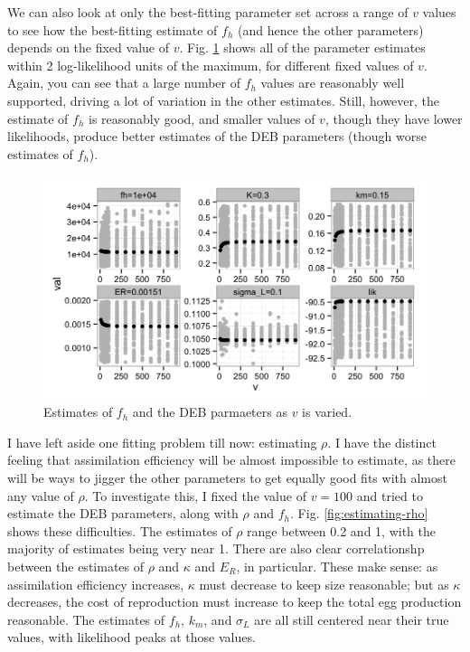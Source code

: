 \documentclass[12pt,reqno,final,pdftex]{amsart}\usepackage[]{graphicx}\usepackage[]{color}
\newenvironment{knitrout}{}{} %
\theoremstyle{plain}
\numberwithin{equation}{part}
\begin{document}
We can also look at only the best-fitting parameter set across a range of $v$ values to see how the best-fitting estimate of $f_h$ (and hence the other parameters) depends on the fixed value of $v$.
Fig. \ref{fig:dyn-food-fh-est-profile-v} shows all of the parameter estimates within 2 log-likelihood units of the maximum, for different fixed values of $v$.
Again, you can see that a large number of $f_h$ values are reasonably well supported, driving a lot of variation in the other estimates.
Still, however, the estimate of $f_h$ is reasonably good, and smaller values of $v$, though they have lower likelihoods, produce better estimates of the DEB parameters (though worse estimates of $f_h$).

\begin{knitrout}\scriptsize
{}\color{fgcolor}\begin{figure}

\includegraphics[width=\linewidth]{figure/dyn-food-fh-est-profile-v-1} \hfill{}

\caption[Estimates of ]{Estimates of $f_h$ and the DEB parmaeters as $v$ is varied.}\label{fig:dyn-food-fh-est-profile-v}
\end{figure}


\end{knitrout}

I have left aside one fitting problem till now: estimating $\rho$.
I have the distinct feeling that assimilation efficiency will be almost impossible to estimate, as there will be ways to jigger the other parameters to get equally good fits with almost any value of $\rho$.
To investigate this, I fixed the value of $v=100$ and tried to estimate the DEB parameters, along with $\rho$ and $f_h$.
Fig. \ref{fig:estimating-rho} shows these difficulties.
The estimates of $\rho$ range between 0.2 and 1, with the majority of estimates being very near 1.
There are also clear correlationshp between the estimates of $\rho$ and $\kappa$ and $E_R$, in particular.
These make sense: as assimilation efficiency increases, $\kappa$ must decrease to keep size reasonable; but as $\kappa$ decreases, the cost of reproduction must increase to keep the total egg production reasonable.
The estimates of  $f_h$, $k_m$, and $\sigma_L$ are all still centered near their true values, with likelihood peaks at those values.
\end{document}
